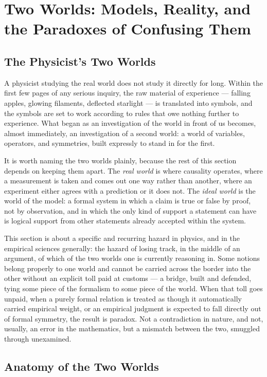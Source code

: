 \section{Two Worlds: Models, Reality, and the Paradoxes of Confusing Them}

\subsection{The Physicist's Two Worlds}

A physicist studying the real world does not study it directly for long. Within
the first few pages of any serious inquiry, the raw material of experience ---
falling apples, glowing filaments, deflected starlight --- is translated into
symbols, and the symbols are set to work according to rules that owe nothing
further to experience. What began as an investigation of the world in front of
us becomes, almost immediately, an investigation of a second world: a world of
variables, operators, and symmetries, built expressly to stand in for the
first.

It is worth naming the two worlds plainly, because the rest of this section
depends on keeping them apart. The \emph{real world} is where causality
operates, where a measurement is taken and comes out one way rather than
another, where an experiment either agrees with a prediction or it does not.
The \emph{ideal world} is the world of the model: a formal system in which a
claim is true or false by proof, not by observation, and in which the only kind
of support a statement can have is logical support from other statements
already accepted within the system.

This section is about a specific and recurring hazard in physics, and in the
empirical sciences generally: the hazard of losing track, in the middle of an
argument, of which of the two worlds one is currently reasoning in. Some
notions belong properly to one world and cannot be carried across the border
into the other without an explicit toll paid at customs --- a bridge, built and
defended, tying some piece of the formalism to some piece of the world. When
that toll goes unpaid, when a purely formal relation is treated as though it
automatically carried empirical weight, or an empirical judgment is expected to
fall directly out of formal symmetry, the result is paradox. Not a
contradiction in nature, and not, usually, an error in the mathematics, but a
mismatch between the two, smuggled through unexamined.

\subsection{Anatomy of the Two Worlds}

